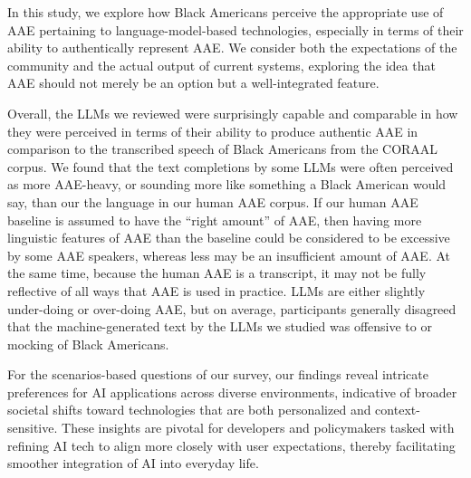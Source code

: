 In this study, we explore how Black Americans perceive the appropriate use of AAE pertaining to language-model-based technologies, %
especially in terms of their ability to authentically represent AAE. We consider both the expectations of the community and the actual output of current systems, exploring the idea that AAE should not merely be an option but a well-integrated feature.

Overall, the LLMs we reviewed were surprisingly capable and comparable in how they were perceived in terms of their ability to produce authentic AAE in comparison to the transcribed speech of Black Americans from the CORAAL corpus. 
We found that the text completions by some LLMs were often perceived as more AAE-heavy, or sounding more like something a Black American would say, than our the language in our human AAE corpus. If our human AAE baseline is assumed to have the ``right amount'' of AAE, then having more linguistic features of AAE than the baseline could be considered to be excessive by some AAE speakers, whereas less may be an insufficient amount of AAE. At the same time, because the human AAE is a transcript, it may not be fully reflective of all ways that AAE is used in practice. LLMs are either slightly under-doing or over-doing AAE, but on average, participants generally disagreed that the machine-generated text by the LLMs we studied was offensive to or mocking of Black Americans.

For the scenarios-based questions of our survey, our findings reveal intricate preferences for AI applications across diverse environments, indicative of broader societal shifts toward technologies that are both personalized and context-sensitive. These insights are pivotal for developers and policymakers tasked with refining AI tech to align more closely with user expectations, thereby facilitating smoother integration of AI into everyday life.

